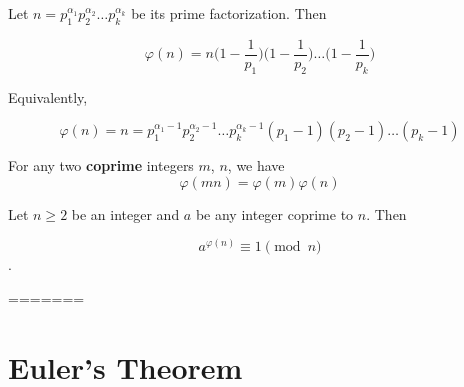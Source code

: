 \begin{theorem}
    Let $n=p_1^{\alpha_1}p_2^{\alpha_2}\dots p_k^{\alpha_k}$ be its prime factorization. Then
    
    \[
    \varphi(n) = n \bigl( 1-\frac1{p_1} \bigr) \bigl( 1-\frac1{p_2} \bigr)\dots \bigl( 1-\frac1{p_k} \bigr)        
    \]

    Equivalently,

    \[
    \varphi(n)=n=p_1^{\alpha_1-1}p_2^{\alpha_2-1}\dots p_k^{\alpha_k-1}
(p_1-1)(p_2-1)\dots(p_k-1)        
    \]    
\end{theorem}

\begin{theorem}
    For any two \textbf{coprime} integers $m$, $n$, we have
    \[\varphi(mn)=\varphi(m)\varphi(n)\]
\end{theorem}

\begin{theorem}
    Let $n \geq 2$ be an integer and $a$ be any integer coprime to $n$. Then

    \[ a^{\varphi(n)}\equiv 1 \pmod n\].    
\end{theorem}
=======
\section{Euler's Theorem}
